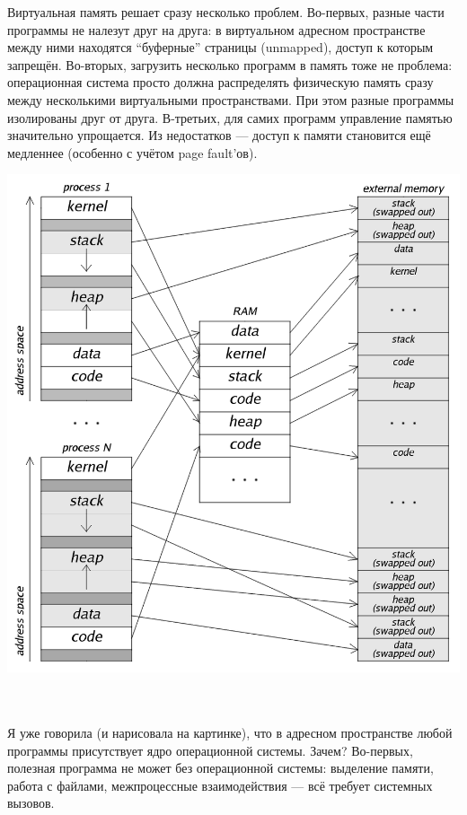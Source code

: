 \documentclass[11pt]{book}
\begin{document}
\begin{minipage}{0.35\textwidth}
Виртуальная память решает сразу несколько проблем.
Во-первых, разные части программы не налезут друг на друга: в виртуальном адресном пространстве между ними находятся ``буферные'' страницы (unmapped),
доступ к которым запрещён.
Во-вторых, загрузить несколько программ в память тоже не проблема: операционная система просто должна распределять
физическую память сразу между несколькими виртуальными пространствами.
При этом разные программы изолированы друг от друга.
В-третьих, для самих программ управление памятью значительно упрощается.
Из недостатков --- доступ к памяти становится ещё медленнее (особенно с учётом page fault'ов).
\end{minipage}
\begin{minipage}{0.65\textwidth}
\includegraphics[width=\textwidth]{pic/virtual_memory.png}
\end{minipage}
\\ \\
Я уже говорила (и нарисовала на картинке), что в адресном пространстве любой программы присутствует ядро операционной системы.
Зачем?
Во-первых, полезная программа не может без операционной системы:
выделение памяти, работа с файлами, межпроцессные взаимодействия --- всё требует системных вызовов.
\end{document}
